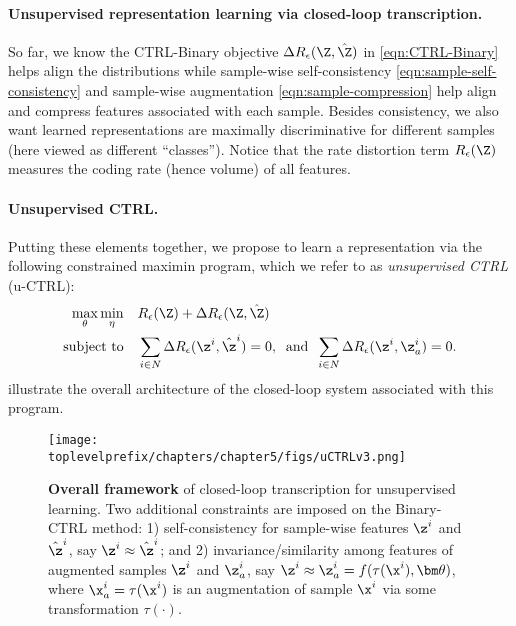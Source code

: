 \documentclass[../../book-main.tex]{subfiles}
\begin{document}
\paragraph{Unsupervised representation learning via closed-loop transcription.} 
So far, we know the CTRL-Binary objective $\Delta R_\epsilon(\Z, \hat{\Z})$ in \eqref{eqn:CTRL-Binary} helps align the distributions while sample-wise self-consistency \eqref{eqn:sample-self-consistency} and sample-wise augmentation \eqref{eqn:sample-compression} help align and compress features associated with each sample. Besides consistency, we also want learned representations are maximally discriminative for different samples (here viewed as different ``classes''). Notice that the rate distortion term $R_\epsilon(\Z)$ measures the coding rate (hence volume) of all features. %

\paragraph{Unsupervised CTRL.} Putting these elements together, we propose to learn a representation via the following constrained maximin program, which we refer to as {\em unsupervised CTRL} (u-CTRL):
\begin{align}
      \max_\theta \min_\eta  \quad & R_\epsilon(\Z) + \Delta R_\epsilon(\Z, \hat{\Z}) \label{eqn:constrained_maxmin}\\
 \mbox{subject to} \quad & \sum_{i\in N} \Delta R_\epsilon(\z^i, \hat{\z}^i) = 0, \;\; \mbox{and} \;\; \sum_{i\in N} \Delta R_\epsilon(\z^i, \z_{a}^i) = 0. \nonumber
\end{align}
 illustrate the overall architecture of the closed-loop system associated with this program.
\begin{figure}[t]
\centering
\texttt{[image: \\toplevelprefix/chapters/chapter5/figs/uCTRLv3.png]}
\caption{\textbf{Overall framework} of closed-loop transcription for unsupervised learning. Two additional constraints are imposed on the Binary-CTRL method: 1) self-consistency for sample-wise features $\z^i$ and $\hat{\z}^i$, say $\z^i \approx \hat{\z}^i$; and 2) invariance/similarity among features of augmented samples $\z^i$ and $\z_{a}^i$, say $\z^i \approx \z_{a}^i=f(\tau(\x^i), \bm \theta)$, where $\x^i_a=\tau(\x^i)$ is an augmentation of sample $\x^i$ via some transformation $\tau(\cdot)$.}
\label{fig:framework-uCTRL}
\end{figure}
\end{document}
